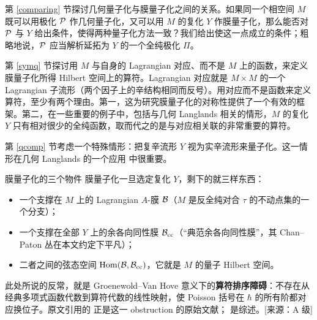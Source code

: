 第 \ref{comparing} 节探讨几何量子化与膜量子化之间的关系。如果同一个相空间 $M$ 既可以用极化 $\P$ 作几何量子化，又可以用 $M$ 的复化 $Y$ 作膜量子化，那么能否对 $\P$ 与 $Y$ 给出条件，使得两种量子化方法一致？我们给出使这一点成立的条件；粗略地说，$\P$ 应当解析延拓为 $Y$ 的一个全纯极化 $\varPi$。

第 \ref{symq} 节探讨用 $M$ 与自身的 Lagrangian 对应、而不是 $M$ 上的函数，来定义膜量子化所得 Hilbert 空间上的算符。Lagrangian 对应就是 $M\times M$ 的一个 Lagrangian 子流形（两个因子上的辛结构相同而反号）。用对应而不是函数来定义算符，至少有两个理由。第一，这为研究膜量子化的对称性提供了一个有效的框架。第二，在一些重要的例子中，包括与几何 Langlands 相关的情形，$M$ 的复化 $Y$ 只有相对很少的全纯函数，取而代之的是与对应相关联的非常重要的算符。

第 \ref{qcomp} 节考虑一个特殊情形：把复辛流形 $Y$ 视为实辛流形来量子化。这一情形在几何 Langlands 的一个应用 \cite{GaW} 中很重要。

\begin{conceptbox}{膜量子化的三个物件}
膜量子化一旦选定复化 $Y$，剩下的就三样东西：
\begin{itemize}[leftmargin=1.2em,itemsep=0.15em,topsep=2pt]
\item 一个支撑在 $M$ 上的 Lagrangian $A$-膜 $\B$（$M$ 是反全纯对合 $\tau$ 的不动点集的一个分支）；
\item 一个支撑在全部 $Y$ 上的余各向同性膜 $\B_\cc$（“典范余各向同性膜”，其 Chan--Paton 丛在本文约定下平凡）；
\item 二者之间的弦态空间 $\Hom(\B,\B_\cc)$，它就是 $M$ 的量子 Hilbert 空间。
\end{itemize}
\end{conceptbox}

\begin{yizhu}[“反常”在这里指什么]
此处所说的反常，就是 Groenewold--Van Hove 意义下的\textbf{算符排序障碍}：不存在从经典多项式函数代数到算符代数的线性映射，使 Poisson 括号在 $\hbar$ 的所有阶都对应换位子。原文引用的 \cite{G46,V51} 正是这一 obstruction 的原始文献；\cite{Todorov} 是综述。[来源：A 级]
\end{yizhu}
